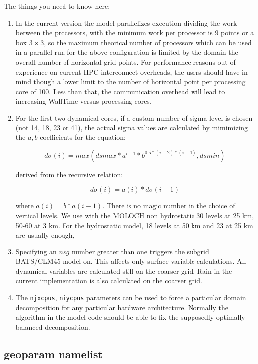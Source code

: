 The things you need to know here:

\begin{enumerate}
\item In the current version the model parallelizes execution dividing
the work between the processors, with the minimum work per processor is 9
points or a box $3\times3$, so the maximum theorical number of processors which
can be used in a parallel run for the above configuration is limited by
the domain the overall number of horizontal grid points. For performance
reasons out of experience on current HPC interconnect overheads, the users
should have in mind though a lower limit to the number of horizontal point per
processing core of 100. Less than that, the communication overhead will
lead to increasing WallTime versus processing cores.
\item For the first two dynamical cores, if a custom number of sigma level is
chosen (not 14, 18, 23 or 41), the actual sigma values are calculated by
mimimizing the $a,b$ coefficients for the equation:

\begin{equation}
  d\sigma(i) = max(dsmax*a^{i-1}*b^{0.5*(i-2)*(i-1)},dsmin)
\end{equation}

derived from the recursive relation:

\begin{equation}
  d\sigma(i) = a(i)*d\sigma(i-1)
\end{equation}

where $a(i) = b*a(i-1)$. 
There is no magic number in the choice of vertical levels. We use with the
MOLOCH non hydrostatic 30 levels at 25 km, 50-60 at 3 km. For the hydrostatic
model, 18 levels at 50 km and 23 at 25 km are usually enough,
\item Specifying an $nsg$ number greater than one triggers the subgrid
BATS/CLM45 model on.  This affects only surface variable calculations.
All dynamical variables are calculated still on the coarser grid.
Rain in the current implementation is also calculated on the coarser
grid.
\item The \verb=njxcpus=, \verb=niycpus= parameters can be used to force
a particular domain decomposition for any particular hardware architecture.
Normally the algorithm in the model code should be able to fix the
supposedly optimally balanced decomposition.
\end{enumerate}

\subsection{geoparam namelist}
\label{geoparam}

